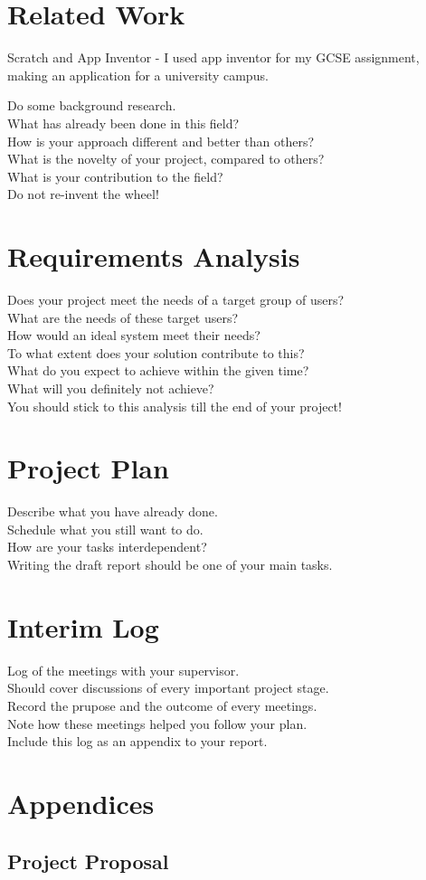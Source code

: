 \documentclass[a4paper, 12pt]{article}
\begin{document}
    \section{Related Work}
    Scratch and App Inventor - I used app inventor for my GCSE assignment, making an application for a university campus.

    Do some background research. \\
    What has already been done in this field? \\
    How is your approach different and better than others? \\
    What is the novelty of your project, compared to others? \\
    What is your contribution to the field? \\
    Do not re-invent the wheel! \\

    \section{Requirements Analysis}
    Does your project meet the needs of a target group of users? \\
    What are the needs of these target users? \\
    How would an ideal system meet their needs? \\
    To what extent does your solution contribute to this? \\
    What do you expect to achieve within the given time? \\
    What will you definitely not achieve? \\
    You should stick to this analysis till the end of your project!

    \section{Project Plan}
    Describe what you have already done. \\
    Schedule what you still want to do. \\
    How are your tasks interdependent? \\
    Writing the draft report should be one of your main tasks.

    \section{Interim Log}
    Log of the meetings with your supervisor. \\
    Should cover discussions of every important project stage. \\
    Record the prupose and the outcome of every meetings. \\
    Note how these meetings helped you follow your plan. \\
    Include this log as an appendix to your report.
    
    \section{Appendices}
        \subsection{Project Proposal}

    \printbibliography
\end{document}
